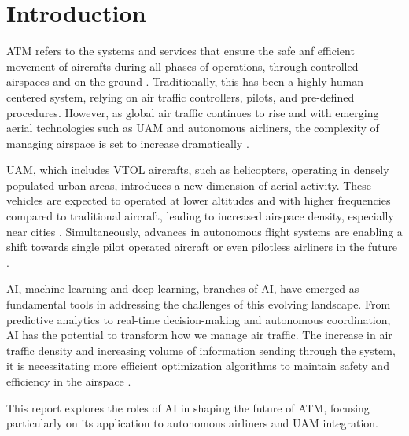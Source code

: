 \section{Introduction}


\Gls{ATM} refers to the systems and services that ensure the safe anf efficient movement of aircrafts during all phases of operations, through controlled airspaces and on the ground \cite{skybraryATM}. 
Traditionally, this has been a highly human-centered system, relying on air traffic controllers, pilots, and pre-defined procedures.
However, as global air traffic continues to rise and with emerging aerial technologies such as \gls{UAM} and autonomous airliners, the complexity of managing airspace is set to increase dramatically \cite{Schuchardt_2023}.

\gls{UAM}, which includes \gls{VTOL} aircrafts, such as helicopters, operating in densely populated urban areas, introduces a new dimension of aerial activity.
These vehicles are expected to operated at lower altitudes and with higher frequencies compared to traditional aircraft, leading to increased airspace density, especially near cities \cite{Schuchardt_2023}.
Simultaneously, advances in autonomous flight systems are enabling a shift towards single pilot operated aircraft or even pilotless airliners in the future \cite{Vance_2019}.

\gls{AI}, machine learning and deep learning, branches of \gls{AI}, have emerged as fundamental tools in addressing the challenges of this evolving landscape.
From predictive analytics to real-time decision-making and autonomous coordination, \gls{AI} has the potential to transform how we manage air traffic.
The increase in air traffic density and increasing volume of information sending through the system, it is necessitating more efficient optimization algorithms to maintain safety and efficiency in the airspace \cite{Tafur_2025}.

This report explores the roles of \gls{AI} in shaping the future of \gls{ATM}, focusing particularly on its application to autonomous airliners and \gls{UAM} integration.